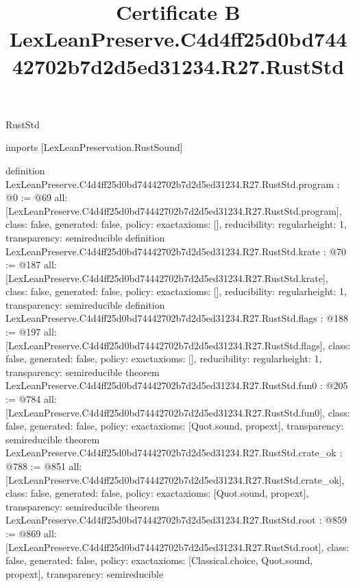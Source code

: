 \begin{lexlean}{RustStd}
\title{Certificate B LexLeanPreserve.C4d4ff25d0bd74442702b7d2d5ed31234.R27.RustStd}
\begin{coremodule}
imports [LexLeanPreservation.RustSound]

definition LexLeanPreserve.C4d4ff25d0bd74442702b7d2d5ed31234.R27.RustStd.program : @0 := @69 {
  all: [LexLeanPreserve.C4d4ff25d0bd74442702b7d2d5ed31234.R27.RustStd.program],
  class: false,
  generated: false,
  policy: exact{axioms: []},
  reducibility: regular{height: 1},
  transparency: semireducible
}
definition LexLeanPreserve.C4d4ff25d0bd74442702b7d2d5ed31234.R27.RustStd.krate : @70 := @187 {
  all: [LexLeanPreserve.C4d4ff25d0bd74442702b7d2d5ed31234.R27.RustStd.krate],
  class: false,
  generated: false,
  policy: exact{axioms: []},
  reducibility: regular{height: 1},
  transparency: semireducible
}
definition LexLeanPreserve.C4d4ff25d0bd74442702b7d2d5ed31234.R27.RustStd.flags : @188 := @197 {
  all: [LexLeanPreserve.C4d4ff25d0bd74442702b7d2d5ed31234.R27.RustStd.flags],
  class: false,
  generated: false,
  policy: exact{axioms: []},
  reducibility: regular{height: 1},
  transparency: semireducible
}
theorem LexLeanPreserve.C4d4ff25d0bd74442702b7d2d5ed31234.R27.RustStd.fun0 : @205 := @784 {
  all: [LexLeanPreserve.C4d4ff25d0bd74442702b7d2d5ed31234.R27.RustStd.fun0],
  class: false,
  generated: false,
  policy: exact{axioms: [Quot.sound, propext]},
  transparency: semireducible
}
theorem LexLeanPreserve.C4d4ff25d0bd74442702b7d2d5ed31234.R27.RustStd.crate_ok : @788 := @851 {
  all: [LexLeanPreserve.C4d4ff25d0bd74442702b7d2d5ed31234.R27.RustStd.crate_ok],
  class: false,
  generated: false,
  policy: exact{axioms: [Quot.sound, propext]},
  transparency: semireducible
}
theorem LexLeanPreserve.C4d4ff25d0bd74442702b7d2d5ed31234.R27.RustStd.root : @859 := @869 {
  all: [LexLeanPreserve.C4d4ff25d0bd74442702b7d2d5ed31234.R27.RustStd.root],
  class: false,
  generated: false,
  policy: exact{axioms: [Classical.choice, Quot.sound, propext]},
  transparency: semireducible
}


\end{coremodule}
\end{lexlean}
